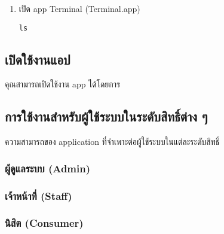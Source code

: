 \documentclass[../docs.tex]{subfiles}
\begin{document}
\begin{enumerate}
\setlength{\itemsep}{0.7pt}
    \item เปิด app Terminal (Terminal.app)

\begin{lstlisting}[frame=none,numbers=none]
ls
\end{lstlisting}
\end{enumerate}

\label{launch-app}
\subsection*{เปิดใช้งานแอป}

\rule{0em}{1ex}

คุณสามารถเปิดใช้งาน app ได้โดยการ

\subsection{การใช้งานสำหรับผู้ใช้ระบบในระดับสิทธิ์ต่าง ๆ}
ความสามารถของ application ที่จำเพาะต่อผู้ใช้ระบบในแต่ละระดับสิทธิ์

\subsubsection{ผู้ดูแลระบบ (Admin)}
\noindent\blindtext[3]

\subsubsection{เจ้าหน้าที่ (Staff)}
\noindent\blindtext[3]

\subsubsection{นิสิต (Consumer)}
\noindent\blindtext[3]
\end{document}
